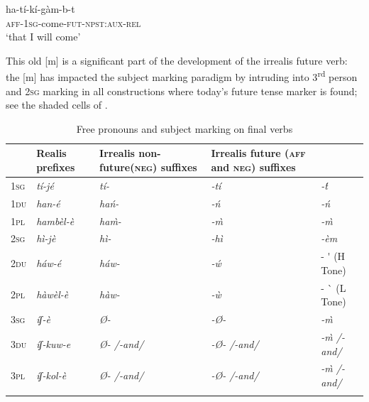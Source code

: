 \documentclass[output=paper]{langsci/langscibook}
\begin{document}
\ea\label{ex:mahland:77}
\gll ha-tí-kí-gàm-b-t\\
  \textsc{aff-1sg}{}-come-\textsc{fut-npst:aux-rel}\\\glt `that I will come'
\z

This old [m] is a significant part of the development of the irrealis future verb: the [m] has impacted the subject marking paradigm by intruding into 3\textsuperscript{rd} person and \textsc{2sg} marking in all constructions where today's future tense marker is found; see the shaded cells of . 

\begin{table}
\caption{Free pronouns and subject marking on final verbs \citep[7]{Ahland2014b}}
\label{tab:mahland:7}
\begin{tabularx}{\textwidth}{llp{1.5cm}Xp{3.5cm}}
\lsptoprule

\multicolumn{2}{X}{\mdseries Free pronouns} & \mdseries Realis prefixes & \mdseries Irrealis non-future\newline (\textsc{neg}) suffixes & \mdseries Irrealis future \newline (\textsc{aff} and \textsc{neg}) suffixes\\
\midrule 
\mdseries \textsc{1sg} & \itshape tí-jé & \itshape tí- & \itshape {}-tí & \itshape {}-\'{t}\\
\mdseries \textsc{1du} & \itshape han-é & \itshape hań- & \itshape {}-ń & \itshape {}-ń\\
\mdseries \textsc{1pl} & \itshape hambèl-è & \itshape ha\`{m}- & \itshape {}-\`{m} & \itshape {}-\`{m}\\
\mdseries \textsc{2sg} & \itshape hì-jè & \itshape hì- & \itshape {}-hì & \itshape {}-èm \\
\mdseries \textsc{2du} & \itshape háw-é & \itshape háw- & \itshape {}-\'{w}   & \mdseries - \'{} (H Tone)\\
\mdseries \textsc{2pl} & \itshape hàwèl-è & \itshape hàw- & \itshape {}-\`{w} & \mdseries - \`{} (L Tone)\\
\mdseries \textsc{3sg} & \itshape íʃ-è & \itshape Ø- & \itshape {}-Ø- & \itshape {}-\`{m}\\
\mdseries \textsc{3du} & \itshape íʃ-kuw-e & \itshape Ø-   /-and/ & \itshape {}-Ø-   /-and/ & \itshape {}-\`{m}     /-and/\\
\mdseries \textsc{3pl} & \itshape íʃ-kol-è & \itshape Ø-   /-and/ & \itshape {}-Ø-   /-and/ & \itshape {}-\`{m}    /-and/\\
\lspbottomrule
\end{tabularx}
\end{table}
\end{document}
